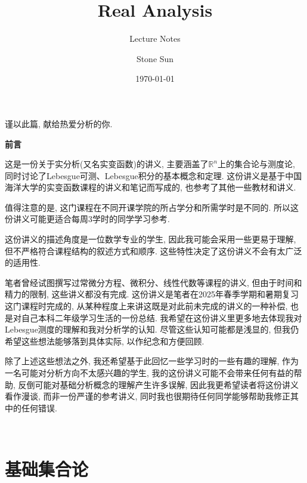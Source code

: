 \documentclass[theorem=false,mathfont=none,openany,sub3section]{easybook}
\title{Real Analysis}
\subtitle{Lecture Notes}
\author{Stone Sun}
\date{\today}
\renewcommand{\rmdefault}{lmr}
\newcommand{\btocgroup}[1][toc]{\addtocontents{#1}{\string\begingroup}}
\newcommand{\etocgroup}[1][toc]{\addtocontents{#1}{\string\endgroup}}
\begin{document}
\maketitle
\begin{center}
谨以此篇, 献给热爱分析的你.\par
\end{center}
\frontmatter

\begingroup
\renewcommand{\familydefault}{\rmdefault}
\tableofcontents
\endgroup

\newpage
\begin{center}
\Large
\textbf{前言}\par
\end{center}

\hspace{2em}

这是一份关于实分析(又名实变函数)的讲义, 主要涵盖了$\mathbb{R}^n$上的集合论与测度论, 同时讨论了Lebesgue可测、Lebesgue积分的基本概念和定理. 这份讲义是基于中国海洋大学的实变函数课程的讲义和笔记而写成的, 也参考了其他一些教材和讲义.\par
值得注意的是, 这门课程在不同开课学院的所占学分和所需学时是不同的. 所以这份讲义可能更适合每周3学时的同学学习参考.\par
这份讲义的描述角度是一位数学专业的学生, 因此我可能会采用一些更易于理解, 但不严格符合课程结构的叙述方式和顺序. 这些特性决定了这份讲义不会有太广泛的适用性.\par
笔者曾经试图撰写过常微分方程、微积分、线性代数等课程的讲义, 但由于时间和精力的限制, 这些讲义都没有完成. 这份讲义是笔者在2025年春季学期和暑期复习这门课程时完成的, 从某种程度上来讲这既是对此前未完成的讲义的一种补偿, 也是对自己本科二年级学习生活的一份总结. 我希望在这份讲义里更多地去体现我对Lebesgue测度的理解和我对分析学的认知. 尽管这些认知可能都是浅显的, 但我仍希望这些想法能够落到具体实际, 以作纪念和方便回顾.\par
除了上述这些想法之外, 我还希望基于此回忆一些学习时的一些有趣的理解, 作为一名可能对分析方向不太感兴趣的学生, 我的这份讲义可能不会带来任何有益的帮助, 反倒可能对基础分析概念的理解产生许多误解, 因此我更希望读者将这份讲义看作漫谈, 而非一份严谨的参考讲义, 同时我也很期待任何同学能够帮助我修正其中的任何错误.\par
\begin{flushright}
\\
\text{\today}
\end{flushright}

\mainmatter

\btocgroup
{}
\chapter{基础集合论}
\etocgroup
\end{document}
